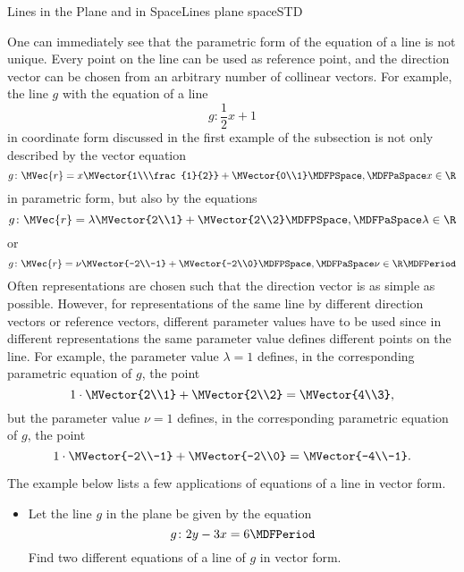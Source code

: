 \begin{MXContent}{Lines in the Plane and in Space}{Lines plane space}{STD}
\begin{MInfo}
\end{MInfo}
One can immediately see that the parametric form of the equation of a line is not unique. Every point on the line 
can be used as reference point, and the direction vector can be chosen from an arbitrary number of collinear
vectors. For example, the line $g$ with the equation of a line 
\[
 g\colon\frac{1}{2}x+1 
\]
in coordinate form discussed in the first example of the subsection is not only described by the vector equation
\[
 g\colon \MVec{r}=x\MVector{1\\\frac{1}{2}}+\MVector{0\\1}\MDFPSpace,\MDFPaSpace x\in\R
\]
in parametric form, but also by the equations
\[
 g\colon \MVec{r}=\lambda\MVector{2\\1}+\MVector{2\\2}\MDFPSpace,\MDFPaSpace \lambda\in\R
\]
or
\[
 g\colon \MVec{r}=\nu\MVector{-2\\-1}+\MVector{-2\\0}\MDFPSpace,\MDFPaSpace \nu\in\R \MDFPeriod
\]
Often representations are chosen such that the direction vector is as simple as possible. However,
for representations of the same line by different direction vectors or reference vectors, 
different parameter values have to be used since in different representations the same parameter value 
defines different points on the line. For example, the parameter value $\lambda=1$ defines, in the corresponding 
parametric equation of $g$, the point
\[
 1\cdot\MVector{2\\1}+\MVector{2\\2}=\MVector{4\\3},
\]
but the parameter value $\nu=1$ defines, in the corresponding 
parametric equation of $g$, the point
\[
 1\cdot\MVector{-2\\-1}+\MVector{-2\\0}=\MVector{-4\\-1}.
\]


The example below lists a few applications of equations of a line in vector form. 

\begin{MExample}
\begin{itemize}
 \item Let the line $g$ in the plane be given by the equation
 \[
  g\colon 2y-3x=6\MDFPeriod
 \]
  Find two different equations of a line of $g$ in vector form.
 

\end{itemize}
\end{MExample}
\end{MXContent}
